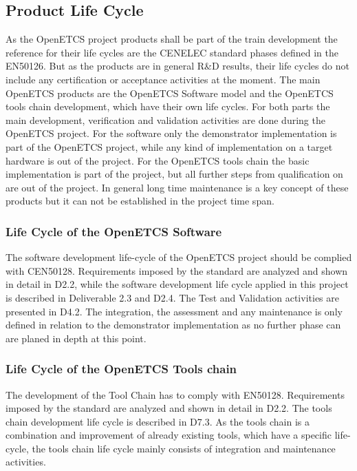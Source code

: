 \documentclass{template/openetcs_article}
\begin{document}
\subsection{Product Life Cycle }

As the OpenETCS project products shall be part of the train development the reference for their life cycles are the CENELEC standard phases defined in the EN50126. But as the products are in general R\&D results, their life cycles do not include any certification or acceptance activities at the moment.
The main OpenETCS products are the OpenETCS Software model and the OpenETCS tools chain development, which have their own life cycles. For both parts the main development, verification and validation activities are done during the OpenETCS project. For the software only the demonstrator implementation is part of the OpenETCS project, while any kind of implementation on a target hardware is out of the project. 
For the OpenETCS tools chain the basic implementation is part of the project, but all further steps from qualification on are out of the project.
In general long time maintenance is a key concept of these products but it can not be established in the project time span. 

\subsubsection{Life Cycle of the OpenETCS Software}
The software development life-cycle of the OpenETCS project should be complied with CEN50128. Requirements imposed by the standard are analyzed and shown in detail in D2.2, while the software development life cycle applied in this project is described in Deliverable 2.3 and D2.4. The Test and Validation activities are presented in D4.2. The integration, the assessment and any maintenance is only defined in relation to the demonstrator implementation as no further phase can are planed in depth at this point.

\subsubsection{Life Cycle of the OpenETCS Tools chain}
The development of the Tool Chain has to comply with EN50128. Requirements imposed by the standard are analyzed and shown in detail in D2.2. The tools chain development life cycle is described in D7.3. As the tools chain is a combination and improvement of already existing tools, which have a specific life-cycle, the tools chain life cycle mainly consists of integration and maintenance activities. 
\end{document}
